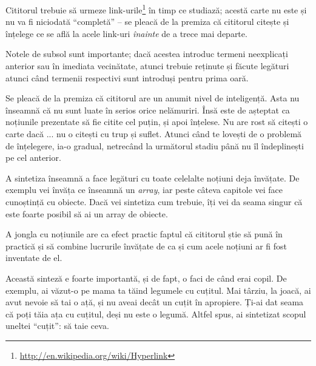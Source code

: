 Cititorul trebuie să urmeze
link-urile\footnote{\url{http://en.wikipedia.org/wiki/Hyperlink}} în timp ce
studiază; acestă carte nu este și nu va fi niciodată ``completă'' -- se pleacă
de la premiza că cititorul citește și înțelege ce se află la acele link-uri
\textit{înainte} de a trece mai departe.

Notele de subsol sunt importante; dacă acestea introduc termeni neexplicați
anterior sau în imediata vecinătate, atunci trebuie reținute și făcute legături
atunci când termenii respectivi sunt introduși pentru prima oară.

Se pleacă de la premiza că cititorul are un anumit nivel de inteligență.  Asta
nu înseamnă că nu sunt luate în serios orice nelămuriri. Însă este de așteptat
ca noțiunile prezentate să fie citite cel puțin, și apoi înțelese.  Nu are rost
să citești o carte dacă ... nu o citești cu trup și suflet.  Atunci când te
lovești de o problemă de înțelegere, ia-o gradual, netrecând la următorul
stadiu până nu îl îndeplinești pe cel anterior.



A sintetiza înseamnă a face legături cu toate celelalte noțiuni
deja învățate. De exemplu vei învăța ce înseamnă un \textsl{array}, iar peste
câteva capitole vei face cunoștință cu obiecte. Dacă vei sintetiza
cum trebuie, îți vei da seama singur că este foarte posibil
să ai un array de obiecte.

A jongla cu noțiunile are ca efect practic faptul că cititorul știe
să pună în practică și să combine lucrurile învățate de ca și cum
acele noțiuni ar fi fost inventate de el.


Această sinteză e foarte importantă, și de fapt, o faci de când erai
copil. De exemplu, ai văzut-o pe mama ta tăind legumele cu cuțitul.
Mai târziu, la joacă, ai avut nevoie să tai o ață, și nu aveai decât
un cuțit în apropiere. Ți-ai dat seama că poți tăia ața cu cuțitul,
deși nu este o legumă. Altfel spus, ai sintetizat scopul uneltei
``cuțit'': să taie ceva.

